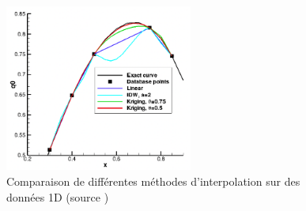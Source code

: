

\begin{figure}[H]
    \centering
    \includegraphics[width=0.55\textwidth]{images/palmer2009_comp_copie.png}
    \caption{Comparaison de différentes méthodes d'interpolation sur des données 1D (source \cite{palmer2009})}
    \label{fig:compar}
\end{figure}


